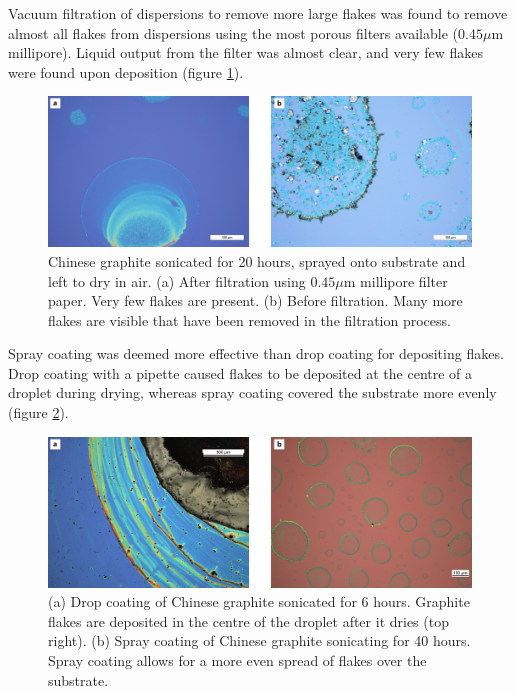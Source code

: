 \documentclass[12pt,titlepage]{article}
\begin{document}
	
	Vacuum filtration of dispersions to remove more large flakes was found to remove almost all flakes from dispersions using the most porous filters available ($0.45\mu$m millipore). Liquid output from the filter was almost clear, and very few flakes were found upon deposition (figure \ref{fig:filter}). 
	
	\begin{figure}
		\centering
		\includegraphics[width=1\textwidth]{figures/filter.png}
		\caption[The effects of vacuum filtration.]{Chinese graphite sonicated for 20 hours, sprayed onto  substrate and left to dry in air. (a) After filtration using $0.45\mu$m millipore filter paper. Very few flakes are present. (b) Before filtration. Many more flakes are visible that have been removed in the filtration process.}
		\label{fig:filter}
	\end{figure}
	
	Spray coating was deemed more effective than drop coating for depositing flakes. Drop coating with a pipette caused flakes to be deposited at the centre of a droplet during drying, whereas spray coating covered the substrate more evenly (figure \ref{fig:pipette}). 
	
	\begin{figure}
		\centering
		\includegraphics[width=1\textwidth]{figures/pipette-vs-spray.png}
		\caption[Comparison of drop coating and spray coating.]{(a) Drop coating of Chinese graphite sonicated for 6 hours. Graphite flakes are deposited in the centre of the droplet after it dries (top right). (b) Spray coating of Chinese graphite sonicating for 40 hours. Spray coating allows for a more even spread of flakes over the substrate.}
		\label{fig:pipette}
	\end{figure}
	
\end{document}
